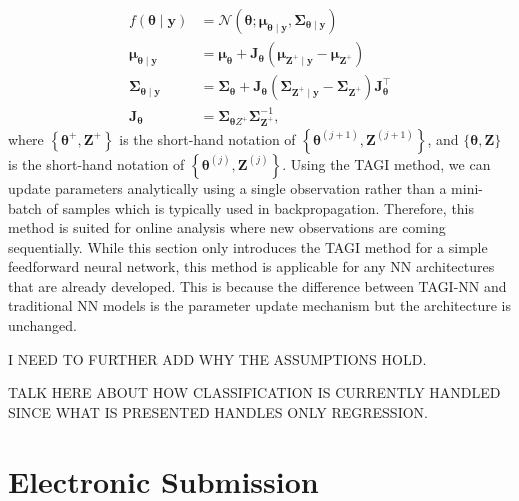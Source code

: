 \documentclass{article}
\begin{document}
\begin{equation*}
\begin{aligned}
f(\boldsymbol{\theta} \mid \boldsymbol{y}) &=\mathcal{N}\left(\boldsymbol{\theta} ; \boldsymbol{\mu}_{\boldsymbol{\theta} \mid \boldsymbol{y}}, \boldsymbol{\Sigma}_{\boldsymbol{\theta} \mid \boldsymbol{y}}\right) \\
\boldsymbol{\mu}_{\boldsymbol{\theta} \mid \boldsymbol{y}} &=\boldsymbol{\mu}_{\boldsymbol{\theta}}+\mathbf{J}_{\boldsymbol{\theta}}\left(\boldsymbol{\mu}_{\boldsymbol{Z}^{+} \mid \boldsymbol{y}}-\boldsymbol{\mu}_{\boldsymbol{Z}^{+}}\right) \\
\boldsymbol{\Sigma}_{\boldsymbol{\theta} \mid \boldsymbol{y}} &=\boldsymbol{\Sigma}_{\boldsymbol{\theta}}+\mathbf{J}_{\boldsymbol{\theta}}\left(\boldsymbol{\Sigma}_{\boldsymbol{Z}^{+} \mid \boldsymbol{y}}-\boldsymbol{\Sigma}_{\boldsymbol{Z}^{+}}\right) \mathbf{J}_{\boldsymbol{\theta}}^{\top} \\
\mathbf{J}_{\boldsymbol{\theta}} &=\boldsymbol{\Sigma}_{\boldsymbol{\theta} Z^{+}} \boldsymbol{\Sigma}_{\boldsymbol{Z}^{+}}^{-1},
\end{aligned}
\end{equation*}
where $\left\{\boldsymbol{\theta}^{+}, \boldsymbol{Z}^{+}\right\}$ is the short-hand notation of $\left\{\boldsymbol{\theta}^{(j+1)}, \boldsymbol{Z}^{(j+1)}\right\}$, and $\{\boldsymbol{\theta}, \boldsymbol{Z}\}$ is the short-hand notation of  $\left\{\boldsymbol{\theta}^{(j)}, \boldsymbol{Z}^{(j)}\right\}$.
Using the TAGI method, we can update parameters analytically using a single observation rather than a mini-batch of samples which is typically used in backpropagation. Therefore, this method is suited for online analysis where new observations are coming sequentially. While this section only introduces the TAGI method for a simple feedforward neural network, this method is applicable for any NN architectures that are already developed. This is because the difference between TAGI-NN and traditional NN models is the parameter update mechanism but the architecture is unchanged.

I NEED TO FURTHER ADD WHY THE ASSUMPTIONS HOLD.

TALK HERE ABOUT HOW CLASSIFICATION IS CURRENTLY HANDLED SINCE WHAT IS PRESENTED HANDLES ONLY REGRESSION.

\section{Electronic Submission}
\label{submission}
\end{document}
